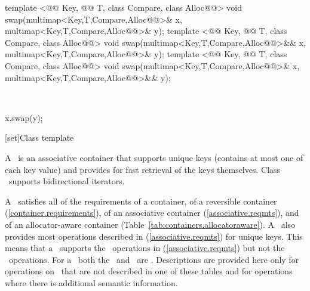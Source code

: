 \documentclass[american,twoside]{book}
\begin{document}
\begin{itemdecl}
template <@@ Key, @@ T, class Compare, class Alloc@@>
  void swap(multimap<Key,T,Compare,Alloc@@>& x,
            multimap<Key,T,Compare,Alloc@@>& y);
template <@@ Key, @@ T, class Compare, class Alloc@@>
  void swap(multimap<Key,T,Compare,Alloc@@>&& x,
            multimap<Key,T,Compare,Alloc@@>& y);
template <@@ Key, @@ T, class Compare, class Alloc@@>
  void swap(multimap<Key,T,Compare,Alloc@@>& x,
            multimap<Key,T,Compare,Alloc@@>&& y);
\end{itemdecl}

\begin{itemdescr}
\pnum
\effects\ 
\begin{codeblock}
x.swap(y);
\end{codeblock}
\end{itemdescr}

[set]{Class template }

\pnum
{}%
A
\
is an associative container that supports unique keys (contains at most one of each key value) and
provides for fast retrieval of the keys themselves.
Class
\
supports bidirectional iterators.

\pnum
A
\
satisfies all of the requirements of a container, of a reversible container
(\ref{container.requirements}), of
an associative container (\ref{associative.reqmts}), and of an allocator-aware container (Table~\ref{tab:containers.allocatoraware}).
A
\
also provides most operations described in (\ref{associative.reqmts})
for unique keys.
This means that a
\tcode{set}\
supports the
\
operations in (\ref{associative.reqmts})
but not the
\tcode{a_eq}\
operations.
For a
\
both the
\
and
\
are
\tcode{Key}.
Descriptions are provided here only for operations on
\tcode{set}\
that are not described in one of these tables
and for operations where there is additional semantic information.
\end{document}
